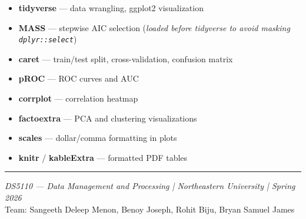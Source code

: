 \documentclass[12pt, letterpaper]{article}
\begin{document}
\begin{itemize}
  \item \textbf{tidyverse} — data wrangling, ggplot2 visualization
  \item \textbf{MASS} — stepwise AIC selection (\textit{loaded before tidyverse to avoid masking \texttt{dplyr::select}})
  \item \textbf{caret} — train/test split, cross-validation, confusion matrix
  \item \textbf{pROC} — ROC curves and AUC
  \item \textbf{corrplot} — correlation heatmap
  \item \textbf{factoextra} — PCA and clustering visualizations
  \item \textbf{scales} — dollar/comma formatting in plots
  \item \textbf{knitr} / \textbf{kableExtra} — formatted PDF tables
\end{itemize}

\vspace{2cm}
\hrule
\vspace{0.3cm}
{\small \textit{DS5110 — Data Management and Processing | Northeastern University | Spring 2026}\\
Team: Sangeeth Deleep Menon, Benoy Joseph, Rohit Biju, Bryan Samuel James}
\end{document}
